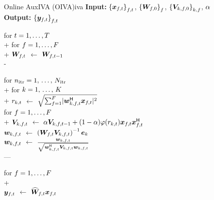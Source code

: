 \documentclass[sip,biber]{now-journal}
\begin{document}
\begin{algorithm}{Online AuxIVA (OIVA)}{iva}
  \textbf{Input:} ${\{\Obs _{\ft}\}} _{\ft}$, $ {\{\bm{W} _{f,0}\}} _{f}$, $ {\{\bm{V} _{k,f,0}\}} _{k,f}$, $ \alpha$\\
  \textbf{Output:} ${\{\Est _{\ft}\}} _{\ft}$
  \begin{pseudo}
    for $t = 1, \dots, T$ \\+
      for $f = 1, \dots, F$ \\+
        {$\Demix _{\ft}$} $\gets$ $\Demix _{\ft[-1]}$ \\-

      for $n _{\mathrm{itr}} = 1,\, \dots,\, N _{\mathrm{itr}}$ \\+
        for $k = 1,\, \dots,\, K$ \\+
          {$r _{k,t}$} $\gets$ $\sqrt{\sum _{\freq = 1} ^{\Freq} \abs{\demix _{\src,\ft} ^{\hermite} \Obs _{\ft}} ^2}$ \ct{\eqref{eq:var}} \\
          for $f = 1, \dots, F$ \\+
            {$\cov _{\src,\ft}    $} $\gets$ $\forget \cov _{\src,\ft[-1]} + (1 - \forget) \weight(\var _{\src,\tframe}) \Obs _{\ft} \Obs _{\ft} ^{\hermite}$ \ct{\eqref{eq:cov}} \\
            {$\demix _{\src,\ft}$} $\gets$ $\left(\Demix _{\ft} \cov _{\src,\ft}\right) ^{-1} \eye _{\src}$ \ct{\eqref{eq:ip:proj}} \\
            {$\demix _{\src,\ft}$} $\gets$ $\frac{\demix _{\src,\ft}}{\sqrt{\demix _{\src,\ft} ^{\hermite} \cov _{\src,\ft} \demix _{\src,\ft}}}$ \ct{\eqref{eq:ip:norm}} \\---

      for $f = 1, \dots, F$ \\+
         \ct{\eqref{eq:pb:w}}\\
        {$\Est _{\ft}$} $\gets$ $\proj{\Demix }_{\ft} \Obs _{\ft}$ \ct{\eqref{eq:pb:y}}
  \end{pseudo}
\end{algorithm}
\end{document}
